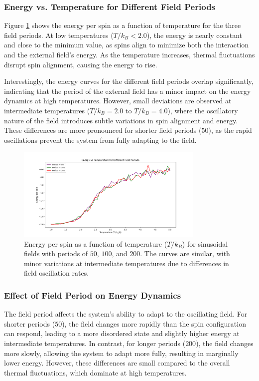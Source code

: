\documentclass[11pt]{article}
\begin{document}
\subsubsection*{Energy vs. Temperature for Different Field Periods}
Figure \ref{fig:sinh_energy} shows the energy per spin as a function of temperature for the three field periods. At low temperatures (\(T / k_B < 2.0\)), the energy is nearly constant and close to the minimum value, as spins align to minimize both the interaction and the external field's energy. As the temperature increases, thermal fluctuations disrupt spin alignment, causing the energy to rise.

Interestingly, the energy curves for the different field periods overlap significantly, indicating that the period of the external field has a minor impact on the energy dynamics at high temperatures. However, small deviations are observed at intermediate temperatures (\(T / k_B = 2.0\) to \(T / k_B = 4.0\)), where the oscillatory nature of the field introduces subtle variations in spin alignment and energy. These differences are more pronounced for shorter field periods (\(50\)), as the rapid oscillations prevent the system from fully adapting to the field.

\begin{figure}[h!]
\centering
\includegraphics[width=0.8\textwidth]{Figs_Salar/SinH E-T (S).png}
\caption{Energy per spin as a function of temperature (\(T / k_B\)) for sinusoidal fields with periods of \(50\), \(100\), and \(200\). The curves are similar, with minor variations at intermediate temperatures due to differences in field oscillation rates.}
\label{fig:sinh_energy}
\end{figure}

\subsubsection*{Effect of Field Period on Energy Dynamics}
The field period affects the system's ability to adapt to the oscillating field. For shorter periods (\(50\)), the field changes more rapidly than the spin configuration can respond, leading to a more disordered state and slightly higher energy at intermediate temperatures. In contrast, for longer periods (\(200\)), the field changes more slowly, allowing the system to adapt more fully, resulting in marginally lower energy. However, these differences are small compared to the overall thermal fluctuations, which dominate at high temperatures.
\end{document}
